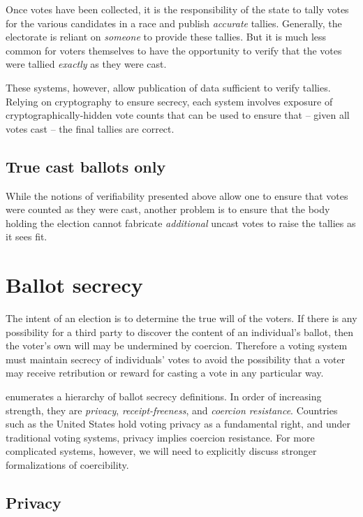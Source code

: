 \documentclass[10pt,twocolumn]{article}
\newcommand{\term}[1]{\textit{#1}}
\begin{document}
Once votes have been collected, it is the responsibility of the state to tally votes for the various
candidates in a race and publish \emph{accurate} tallies. Generally, the electorate is reliant on
\emph{someone} to provide these tallies. But it is much less common for voters themselves to have
the opportunity to verify that the votes were tallied \emph{exactly} as they were cast.

These systems, however, allow publication of data sufficient to verify tallies. Relying on
cryptography to ensure secrecy, each system involves exposure of cryptographically-hidden vote
counts that can be used to ensure that -- given all votes cast -- the final tallies are correct.

\subsection{True cast ballots only}

While the notions of verifiability presented above allow one to ensure that votes were counted as
they were cast, another problem is to ensure that the body holding the election cannot fabricate
\emph{additional} uncast votes to raise the tallies as it sees fit.

\section{Ballot secrecy}

The intent of an election is to determine the true will of the voters.
If there is any possibility for a third party to discover the content of
an individual's ballot, then the voter's own will may be undermined by coercion.
Therefore a voting system must maintain secrecy of individuals' votes to avoid
the possibility that a voter may receive retribution or reward for casting a vote
in any particular way.

\cite{delaune} enumerates a hierarchy of ballot secrecy definitions.
In order of increasing strength, they are
\term{privacy}, \term{receipt-freeness}, and \term{coercion resistance}.
Countries such as the United States hold voting privacy as a fundamental right,
and under traditional voting systems, privacy implies coercion resistance.
For more complicated systems, however, we will need to explicitly discuss
stronger formalizations of coercibility.

\subsection{Privacy}
\end{document}
